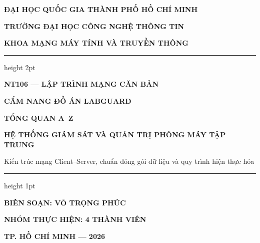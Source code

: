 \documentclass[12pt,a4paper]{article}
\begin{document}
\begin{titlepage}
  \centering
  \vspace*{-10mm}
  {\bfseries\large ĐẠI HỌC QUỐC GIA THÀNH PHỐ HỒ CHÍ MINH\par}
  {\bfseries\large TRƯỜNG ĐẠI HỌC CÔNG NGHỆ THÔNG TIN\par}
  {\bfseries\large KHOA MẠNG MÁY TÍNH VÀ TRUYỀN THÔNG\par}
  \vspace{15mm}
  {\color{lgDeepBlue}\hrule height 2pt}
  \vspace{12mm}
  {\bfseries\large NT106 — LẬP TRÌNH MẠNG CĂN BẢN\par}
  \vspace{12mm}
  {\bfseries\huge\color{lgDeepBlue} CẨM NANG ĐỒ ÁN LABGUARD\par}
  \vspace{5mm}
  {\bfseries\Huge\color{lgDeepBlue} TỔNG QUAN A--Z\par}
  \vspace{8mm}
  {\bfseries\Large HỆ THỐNG GIÁM SÁT VÀ QUẢN TRỊ PHÒNG MÁY TẬP TRUNG\par}
  \vspace{4mm}
  {\large Kiến trúc mạng Client--Server, chuẩn đóng gói dữ liệu và quy trình hiện thực hóa\par}
  \vspace{12mm}
  {\color{lgTeal}\hrule height 1pt}
  \vspace{25mm}
  {\large\textbf{BIÊN SOẠN: VÕ TRỌNG PHÚC}\par}
  \vspace{6mm}
  {\large\textbf{NHÓM THỰC HIỆN: 4 THÀNH VIÊN}\par}
  \vfill
  {\bfseries\color{lgSlate} TP. HỒ CHÍ MINH — 2026\par}
\end{titlepage}

\setcounter{page}{1}

\renewcommand{\contentsname}{MỤC LỤC}
\tableofcontents
\newpage

\setcounter{page}{1}

\end{document}
